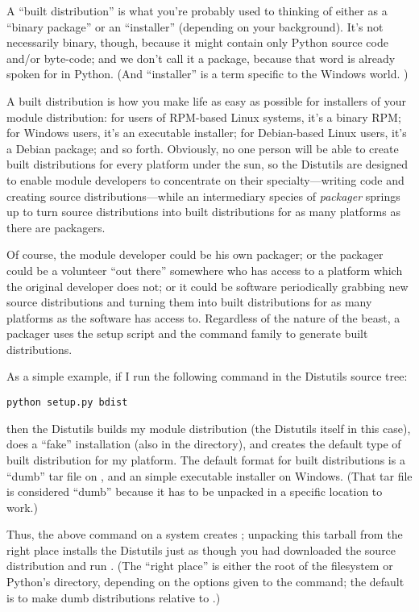 \documentclass{howto}
\begin{document}
A ``built distribution'' is what you're probably used to thinking of
either as a ``binary package'' or an ``installer'' (depending on your
background).  It's not necessarily binary, though, because it might
contain only Python source code and/or byte-code; and we don't call it a
package, because that word is already spoken for in Python.  (And
``installer'' is a term specific to the Windows world.  )

A built distribution is how you make life as easy as possible for
installers of your module distribution: for users of RPM-based Linux
systems, it's a binary RPM; for Windows users, it's an executable
installer; for Debian-based Linux users, it's a Debian package; and so
forth.  Obviously, no one person will be able to create built
distributions for every platform under the sun, so the Distutils are
designed to enable module developers to concentrate on their
specialty---writing code and creating source distributions---while an
intermediary species of \emph{packager} springs up to turn source
distributions into built distributions for as many platforms as there
are packagers.

Of course, the module developer could be his own packager; or the
packager could be a volunteer ``out there'' somewhere who has access to
a platform which the original developer does not; or it could be
software periodically grabbing new source distributions and turning them
into built distributions for as many platforms as the software has
access to.  Regardless of the nature of the beast, a packager uses the
setup script and the  command family to generate built
distributions.

As a simple example, if I run the following command in the Distutils
source tree:
\begin{verbatim}
python setup.py bdist
\end{verbatim}
then the Distutils builds my module distribution (the Distutils itself
in this case), does a ``fake'' installation (also in the 
directory), and creates the default type of built distribution for my
platform.  The default format for built distributions is a ``dumb'' tar
file on \UNIX, and an simple executable installer on Windows.  (That tar
file is considered ``dumb'' because it has to be unpacked in a specific
location to work.)

Thus, the above command on a \UNIX{} system creates
; unpacking this tarball
from the right place installs the Distutils just as though you had
downloaded the source distribution and run .  (The ``right place'' is either the root of the filesystem or 
Python's  directory, depending on the options given to
the  command; the default is to make dumb
distributions relative to .)  
\end{document}
